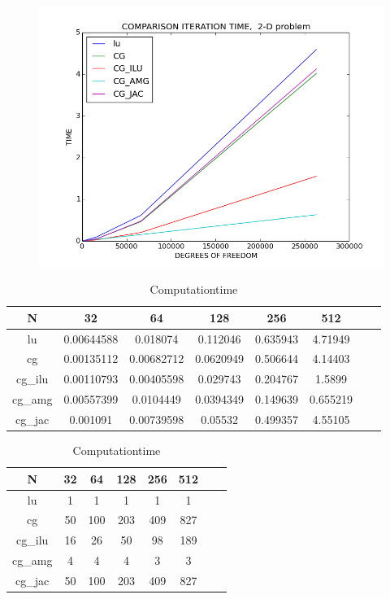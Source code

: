 \documentclass[a4paper,norsk]{article}
\begin{document}
\newpage

\begin{figure}
\centering
\includegraphics[scale=0.4]{comparefig.png}
\end{figure}

\begin{table}[h!]
\caption {Computationtime} 
\centering
\begin{tabular}{|c|c|c|c|c|c|c|c}
\hline
\rowcolor{LightCyan}
 N      &         32 &         64 &       128 &      256 &      512 \\
\hline
 lu     & 0.00644588 & 0.018074   & 0.112046  & 0.635943 & 4.71949  \\
 \rowcolor{LightCyan}
 cg     & 0.00135112 & 0.00682712 & 0.0620949 & 0.506644 & 4.14403  \\
 cg\_ilu & 0.00110793 & 0.00405598 & 0.029743  & 0.204767 & 1.5899   \\
 \rowcolor{LightCyan}
 cg\_amg & 0.00557399 & 0.0104449  & 0.0394349 & 0.149639 & 0.655219 \\
 cg\_jac & 0.001091   & 0.00739598 & 0.05532   & 0.499357 & 4.55105  \\
\hline
\end{tabular}
\end{table}

\begin{table}[h!]
\caption {Computationtime} 
\centering
\begin{tabular}{|c|c|c|c|c|c|c|c}
\hline
\rowcolor{LightCyan}
 N      &   32 &   64 &   128 &   256 &   512 \\ 
\hline
 lu     &    1 &    1 &     1 &     1 &     1 \\ 
 \rowcolor{LightCyan} \hline
 cg     &   50 &  100 &   203 &   409 &   827 \\ 
 cg\_ilu &   16 &   26 &    50 &    98 &   189 \\ 
 \rowcolor{LightCyan} 
 cg\_amg &    4 &    4 &     4 &     3 &     3 \\ 
 cg\_jac &   50 &  100 &   203 &   409 &   827 \\

\hline
\end{tabular}
\end{table}
\end{document}
